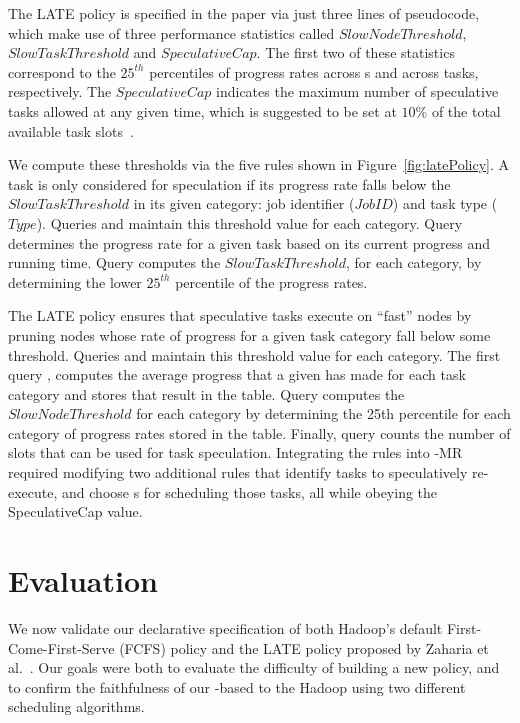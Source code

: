 The LATE policy is specified in the paper via just three lines of pseudocode,
which make use of three performance statistics called $SlowNodeThreshold$,
$SlowTaskThreshold$ and $SpeculativeCap$.  The first two of these statistics
correspond to the $25^{th}$ percentiles of progress rates across {\TT}s and
across tasks, respectively.  The $SpeculativeCap$ indicates the maximum number
of speculative tasks allowed at any given time, which is suggested to be set at
$10\%$ of the total available task slots~\cite{zaharia-late}.

We compute these thresholds via the five \OVERLOG rules shown in
Figure~\ref{fig:latePolicy}.  A task is only considered for speculation if its
progress rate falls below the $SlowTaskThreshold$ in its given category: job
identifier ($JobID$) and task type ($Type$).  Queries  and 
maintain this threshold value for each category.  Query  determines the
progress rate for a given task based on its current progress and running time.
Query  computes the $SlowTaskThreshold$, for each category, by
determining the lower $25^{th}$ percentile of the progress rates.

The LATE policy ensures that speculative tasks execute on ``fast'' nodes by
pruning \TT nodes whose rate of progress for a given task category fall below
some threshold.  Queries  and  maintain this threshold value for
each category.  The first query , computes the average progress that a
given \TT has made for each task category and stores that result in the
 table.  Query  computes the $SlowNodeThreshold$ for each
category by determining the 25th percentile for each category of progress rates
stored in the  table.  Finally, query  counts the number
of slots that can be used for task speculation.  Integrating the rules into
\BOOM-MR required modifying two additional \OVERLOG rules that identify tasks
to speculatively re-execute, and choose {\TT}s for scheduling those tasks, all
while obeying the SpeculativeCap value.

\section{Evaluation}
\label{ch:boom:sec:eval}

We now validate our declarative specification of both Hadoop's default
First-Come-First-Serve (FCFS) policy and the LATE policy proposed by Zaharia et
al.~\cite{zaharia-late}. Our goals were both to evaluate the difficulty of
building a new policy, and to confirm the faithfulness of our \OVERLOG-based
{\JT} to the Hadoop {\JT} using two different scheduling algorithms.


